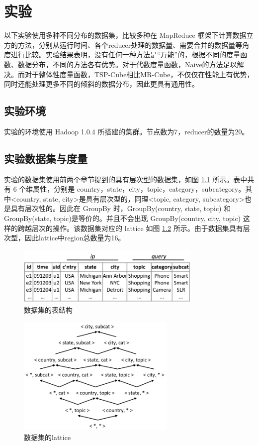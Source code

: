 \chapter{实验}

以下实验使用多种不同分布的数据集，比较多种在 MapReduce 框架下计算数据立方的方法，分别从运行时间、各个reducer处理的数据量、需要合并的数据量等角度进行比较。实验结果表明，没有任何一种方法是``万能”的，根据不同的度量函数、数据分布，不同的方法各有优势。对于代数度量函数，Naive的方法足以解决。而对于整体性度量函数，TSP-Cube相比MR-Cube，不仅仅在性能上有优势，同时还能处理更多不同的倾斜的数据分布，因此更具有通用性。

\section{实验环境}
实验的环境使用 Hadoop 1.0.4 所搭建的集群。节点数为7，reducer的数量为20。

\section{实验数据集与度量}

实验的数据集使用前两个章节提到的具有层次型的数据集，如图 \ref{dataset_table} 所示。表中共有 6 个维属性，分别是 country，state，city，topic，category，subcategory。其中\textless country, state, city\textgreater 是具有层次型的，同理\textless topic, category, subcategory\textgreater 也是具有层次性的。因此在 GroupBy 时，GroupBy(country, state, topic) 和 GroupBy(state, topic)是等价的。并且不会出现 GroupBy(country, city, topic) 这样的跨越层次的操作。该数据集对应的 lattice 如图 \ref{dataset_lattice} 所示。由于数据集具有层次型，因此lattice中region总数量为16。

\begin{figure}[!htb]
\centering\includegraphics[width=3.5in]{picture/ch_datacube_mr/dataset_table} 
\caption{数据集的表结构}\label{dataset_table} 
\end{figure} 

\begin{figure}[!htb]
\centering\includegraphics[width=3in]{picture/ch_datacube_mr/dataset_lattice} 
\caption{数据集的lattice}\label{dataset_lattice} 
\end{figure} 

